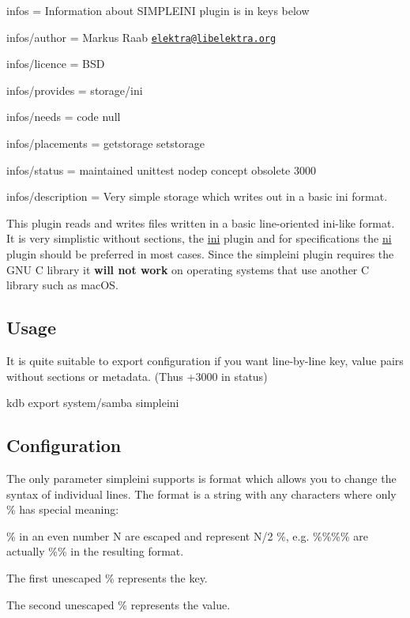 
\begin{DoxyItemize}
\item infos = Information about S\+I\+M\+P\+L\+E\+I\+NI plugin is in keys below
\item infos/author = Markus Raab \href{mailto:elektra@libelektra.org}{\tt elektra@libelektra.\+org}
\item infos/licence = B\+SD
\item infos/provides = storage/ini
\item infos/needs = code null
\item infos/placements = getstorage setstorage
\item infos/status = maintained unittest nodep concept obsolete 3000
\item infos/description = Very simple storage which writes out in a basic ini format.
\end{DoxyItemize}

This plugin reads and writes files written in a basic line-\/oriented ini-\/like format. It is very simplistic without sections, the \hyperlink{md_src_plugins_ini_README_src_plugins_ini_README_md}{ini} plugin and for specifications the \hyperlink{md_src_plugins_ni_README_src_plugins_ni_README_md}{ni} plugin should be preferred in most cases. Since the {\ttfamily simpleini} plugin requires the G\+NU C library it {\bfseries will not work} on operating systems that use another C library such as mac\+OS.

\subsection*{Usage}

It is quite suitable to export configuration if you want line-\/by-\/line key, value pairs without sections or metadata. (Thus +3000 in status)


\begin{DoxyCode}
kdb export system/samba simpleini
\end{DoxyCode}


\subsection*{Configuration}

The only parameter simpleini supports is {\ttfamily format} which allows you to change the syntax of individual lines. The {\ttfamily format} is a string with any characters where only {\ttfamily \%} has special meaning\+:


\begin{DoxyItemize}
\item {\ttfamily \%} in an even number N are escaped and represent N/2 {\ttfamily \%}, e.\+g. {\ttfamily \%\%\%\%} are actually {\ttfamily \%\%} in the resulting format.
\item The first unescaped {\ttfamily \%} represents the key.
\item The second unescaped {\ttfamily \%} represents the value.
\end{DoxyItemize}

